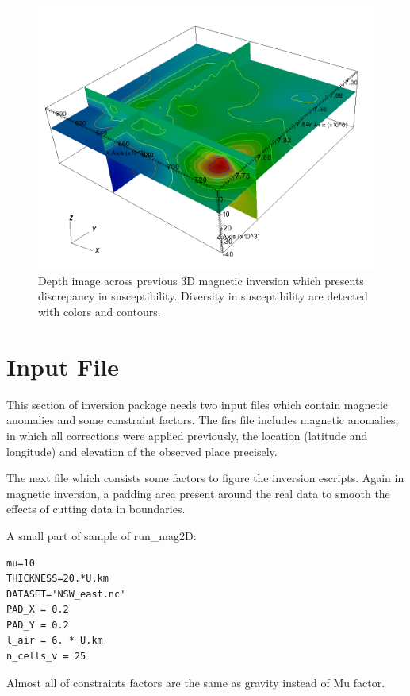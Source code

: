 \begin{figure}
\centering
\includegraphics[width=\textwidth]{sus3D.png}
\caption{Depth image across previous 3D magnetic inversion which presents discrepancy in susceptibility. Diversity in susceptibility are detected with colors and contours.}
\end{figure}

\section{Input File} 

This section of inversion package needs two input files which contain magnetic anomalies and some constraint factors. The firs file includes magnetic anomalies, in which all corrections were applied previously, the location (latitude and longitude) and elevation of the observed place precisely.

The next file which consists some factors to figure the inversion escripts. Again in magnetic inversion, a padding area present around the real data to smooth the effects of cutting data in boundaries.
 
A small part of sample of run_mag2D:

\begin{verbatim}
mu=10
THICKNESS=20.*U.km
DATASET='NSW_east.nc'
PAD_X = 0.2
PAD_Y = 0.2
l_air = 6. * U.km
n_cells_v = 25
\end{verbatim}

Almost all of constraints factors are the same as gravity instead of Mu factor.\\

